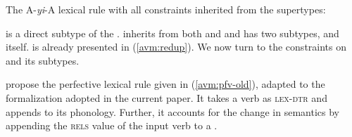 \ea\label{avm:AyiA}
The A-\textit{yi}-A lexical rule with all constraints inherited from the supertypes:\\
\z

 is a direct subtype of the .
 inherits from both  and 
and has two subtypes,  and  itself.
 is already presented in (\ref{avm:redup}). 
We now turn to the constraints on  and its subtypes.


\citet[246]{MuellerLipenkova2013} propose the perfective lexical rule given in (\ref{avm:pfv-old}), 
adapted to the formalization adopted in the current paper.
It takes a verb as \textsc{lex-dtr}
and appends  to its phonology.
Further, it accounts for the change in semantics by appending the \textsc{rels} value of the input verb to a .

